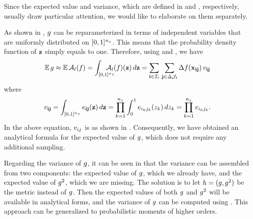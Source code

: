 Since the expected value and variance, which are defined in 
and , respectively, usually draw particular attention, we would
like to elaborate on them separately.

As shown in , $g$ can be reparameterized in terms of
independent variables that are uniformly distributed on $[0, 1]^{n_z}$. This means
that the probability density function of $\mathbf{z}$ simply equals to one. Therefore,
using  and , we have
\[
  \mathbb{E} \, g \approx \mathbb{E} \, \mathcal{A}_{l}(f) = \int_{[0, 1]^{n_z}} \hspace{-1.5em} \mathcal{A}_{l}(f)(\mathbf{z}) \, d\mathbf{z} = \sum_{\mathbf{i} \in \mathcal{I}_l} \, \sum_{\mathbf{j} \in \Delta\mathcal{J}_{\mathbf{i}}} \Delta f(\mathbf{x}_{\mathbf{i}\mathbf{j}}) \, v_{\mathbf{i}\mathbf{j}}
\]
where
\[
  v_{\mathbf{i}\mathbf{j}} = \int_{[0, 1]^{n_z}} e_{\mathbf{i}\mathbf{j}}(\mathbf{z}) \, d\mathbf{z} = \prod_{k = 1}^{{n_z}} \int_0^1 e_{i_k j_k}(z_k) \, dz_k = \prod_{k = 1}^{{n_z}} v_{i_k j_k}.
\]
In the above equation, $v_{ij}$ is as shown in . Consequently, we
have obtained an analytical formula for the expected value of $g$, which does
not require any additional sampling.

Regarding the variance of $g$, it can be seen in  that the
variance can be assembled from two components: the expected value of $g$, which
we already have, and the expected value of $g^2$, which we are missing. The
solution is to let $h = (g, g^2)$ be the metric instead of $g$. Then the
expected values of both $g$ and $g^2$ will be available in analytical forms,
and the variance of $g$ can be computed using . This approach
can be generalized to probabilistic moments of higher orders.
